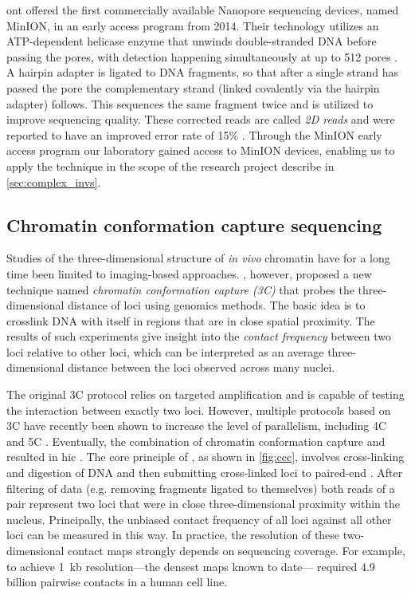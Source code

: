 \Ac{ont} offered the first commercially available
Nanopore sequencing devices, named MinION, in an early access program from 2014.
Their technology utilizes an ATP-dependent helicase enzyme that unwinds double-stranded DNA
before passing the pores, with detection happening simultaneously at up to
512 pores \citep{Jain2015}. A hairpin adapter is ligated to DNA fragments, so
that after a single strand has passed the pore the complementary strand
(linked covalently via the hairpin adapter) follows. This sequences the same
fragment twice and is utilized to improve sequencing quality. These corrected reads
are called \emph{2D reads} and were reported to have an improved error rate of
15\% \citep{Jain2015}. Through the MinION early access program our laboratory
gained access to MinION devices, enabling us to apply the technique in the scope
of the research project describe in \cref{sec:complex_invs}.






\subsection{Chromatin conformation capture sequencing}
\label{sec:ccc}

Studies of the three-dimensional structure of \textit{in vivo} chromatin have for a long
time been limited to imaging-based approaches. \citet{Dekker2002}, however,
proposed a new technique named \emph{chromatin conformation capture (3C)} that
probes the three-dimensional distance of loci using genomics methods. The basic
idea is to crosslink DNA with itself in regions that are in close spatial
proximity. The results of such experiments give insight into the \emph{contact
frequency} between two loci relative to other loci, which can be interpreted as
an average three-dimensional distance between the loci observed across many
nuclei.

The original 3C protocol relies on targeted \pcr amplification and is
capable of testing the interaction between exactly two loci. However, multiple
protocols based on 3C have recently been shown to increase the level of
parallelism, including 4C \citep{Zhao2006,Simonis2006} and 5C \citep{Dostie2006}.
Eventually, the combination of chromatin conformation capture and \mps resulted
in \acf{hic} \citep{Lieberman-Aiden2009}. The core principle of \hic, as shown
in \cref{fig:ccc}, involves cross-linking and digestion of DNA and then
submitting cross-linked loci to paired-end \mps. After filtering of data (e.g.
removing fragments ligated to themselves) both reads of a pair represent two
loci that were in close three-dimensional proximity within the nucleus.
Principally, the unbiased contact frequency of all loci against all other loci
can be measured in this way. In practice, the resolution of these two-dimensional
contact maps strongly depends on sequencing coverage. For example, to achieve
1~kb resolution---the densest maps known to date---\citet{Rao2014} required 4.9
billion pairwise contacts in a human cell line.

